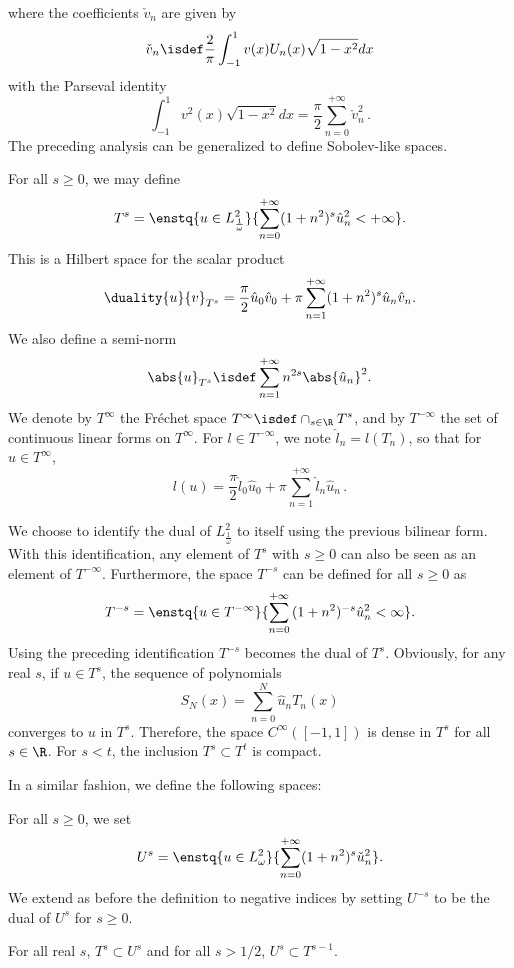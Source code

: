 \documentclass[a4paper]{article}
\begin{document}
	where the coefficients $\check{v}_n$ are given by 
	\[ \check{v}_n \isdef 
	\dfrac{2}{\pi}\displaystyle\int_{-1}^{1} v(x) U_n(x)\sqrt{1-x^2}dx  \]
	with the Parseval identity
	\[ \int_{-1}^{1} v^2(x)\sqrt{1-x^2} dx =  \frac{\pi}{2} \sum_{n=0}^{+\infty}\check{v}_n^2\,.\]
	The preceding analysis can be generalized to define Sobolev-like spaces. 
	\begin{Def}
		For all $s \geq 0$, we may define 
		\[T^s = \enstq{ u \in L^2_\frac{1}{\omega}}{ \sum_{n=0}^{+\infty}(1+n^2)^s \hat{u}_n^2 < + \infty}.\]
		This is a Hilbert space for the scalar product
		\[\duality{u}{v}_{T^s} = \frac{\pi}{2}\hat{u}_0 \hat{v}_0 + \pi\sum_{n=1}^{+\infty}(1+n^2)^s\hat{u}_n \hat{v}_n.\]
		We also define a semi-norm 
		\[\abs{u}_{T^s} \isdef \sum_{n = 1}^{+ \infty}n^{2s} \abs{\hat{u}_n}^2.\]
		We denote by $T^{\infty}$ the Fr\'echet space $T^{\infty} \isdef \displaystyle\cap_{s \in \R} T^s$, and by $T^{-\infty}$ the set of continuous linear forms on $T^{\infty}$. For $l \in T^{-\infty}$, we note $\hat{l}_n = l(T_n)$, so that for $u \in T^{\infty}$, 
		\[l(u) = \frac{\pi}{2}\hat{l}_0 \hat{u}_0 + \pi \sum_{n=1}^{+\infty} \hat{l}_n \hat{u}_n\,.\] 
		
		We choose to identify the dual of $L^2_\frac{1}{\omega}$ to itself using the previous bilinear form.  With this identification, any element of $T^s$ with $s \geq 0$ can also be seen as an element of $T^{-\infty}$.  
		Furthermore, the space $T^{-s}$ can be defined for all $s \geq 0$ as
		\[T^{-s} = \enstq{ u \in T^{-\infty}}{ \sum_{n=0}^{+\infty}{(1 + n^2)^{-s} \hat{u}_n^2} < \infty}.\]
		Using the preceding identification $T^{-s}$ becomes the dual of $T^s$. Obviously, for any real $s$, if $u \in T^s$, the sequence of polynomials 
		\[S_N(x) = \sum_{n=0}^{N} \hat{u}_n T_n(x)\]
		converges to $u$ in $T^s$. Therefore, the space $C^{\infty}([-1,1])$ is dense in $T^s$ for all $s \in \R$. For $s < t$, the inclusion $T^s \subset T^t$ is compact.
	\end{Def}
	\noindent In a similar fashion, we define the following spaces:
	\begin{Def}
		For all $s \geq 0$, we set
		\[U^s = \enstq{u \in L^2_\omega}{ \sum_{n=0}^{+\infty} (1 + n^2)^s\check{u}_n^2}.\]
		We extend as before the definition to negative indices by setting $U^{-s}$ to be the dual of $U^s$ for $s\geq 0$. 
	\end{Def}
	\begin{Lem}
		\label{inclusionsTsUs}
		For all real $s$, $T^s \subset U^s$ and for all $s > 1/2$, $U^s \subset T^{s-1}$.
	\end{Lem}
\end{document}

